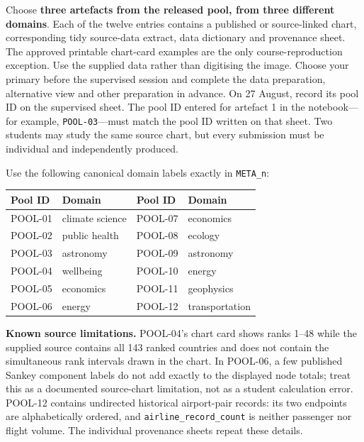 \documentclass[11pt,a4paper]{article}
\newcommand{\labelbox}[1]{\colorbox{panel}{\texttt{\small #1}}}
\begin{document}
Choose \textbf{three artefacts from the released pool, from three different
domains}. Each of the twelve entries contains a published or source-linked
chart, corresponding tidy source-data extract, data dictionary and provenance
sheet. The approved printable chart-card examples are the only course-reproduction
exception. Use the supplied data rather than digitising the image. Choose your primary before the
supervised session and complete the data preparation, alternative view and other
preparation in advance. On 27 August, record its pool ID on the supervised
sheet. The pool ID entered for artefact 1 in the notebook---for example,
\labelbox{POOL-03}---must match the pool ID written on that sheet. Two students
may study the same source chart, but
every submission must be individual and independently produced.

Use the following canonical domain labels exactly in \labelbox{META\_n}:

\begin{center}
\begin{tabular}{@{}ll ll@{}}
\toprule
\textbf{Pool ID} & \textbf{Domain} & \textbf{Pool ID} & \textbf{Domain} \\
\midrule
POOL-01 & climate science & POOL-07 & economics \\
POOL-02 & public health & POOL-08 & ecology \\
POOL-03 & astronomy & POOL-09 & astronomy \\
POOL-04 & wellbeing & POOL-10 & energy \\
POOL-05 & economics & POOL-11 & geophysics \\
POOL-06 & energy & POOL-12 & transportation \\
\bottomrule
\end{tabular}
\end{center}

\textbf{Known source limitations.} POOL-04's chart card shows ranks 1--48
while the supplied source contains all 143 ranked countries and does not
contain the simultaneous rank intervals drawn in the chart. In POOL-06, a few
published Sankey component labels do not add exactly to the displayed node
totals; treat this as a documented source-chart limitation, not as a student
calculation error. POOL-12 contains undirected historical airport-pair
records: its two endpoints are alphabetically ordered, and
\labelbox{airline\_record\_count} is neither passenger nor flight volume. The
individual provenance sheets repeat these details.
\end{document}
